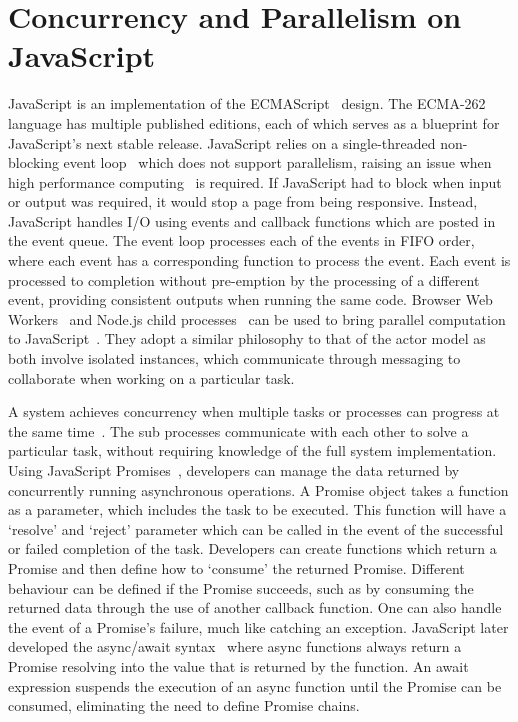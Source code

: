 \documentclass[oneside]{um-fict}
\begin{document}
\section{Concurrency and Parallelism on JavaScript}
JavaScript is an implementation of the ECMAScript~\cite{ecmascript} design. The ECMA-262 language has multiple published editions, each of which serves as a blueprint for JavaScript's next stable release. JavaScript relies on a single-threaded non-blocking event loop~\cite{eventloopbrowser, eventloopnode} which does not support parallelism, raising an issue when high performance computing~\cite{highperformance} is required. If JavaScript had to block when input or output was required, it would stop a page from being responsive. Instead, JavaScript handles I/O using events and callback functions which are posted in the event queue. The event loop processes each of the events in FIFO order, where each event has a corresponding function to process the event. Each event is processed to completion without pre-emption by the processing of a different event, providing consistent outputs when running the same code. Browser Web Workers~\cite{webworkers} and Node.js child processes~\cite{nodejs, cluster} can be used to bring parallel computation to JavaScript~\cite{concurrencyjs, spidersjs}. They adopt a similar philosophy to that of the actor model as both involve isolated instances, which communicate through messaging to collaborate when working on a particular task.

A system achieves concurrency when multiple tasks or processes can progress at the same time~\cite{concurrency}. The sub processes communicate with each other to solve a particular task, without requiring knowledge of the full system implementation. Using JavaScript Promises~\cite{promises}, developers can manage the data returned by concurrently running asynchronous operations. A Promise object takes a function as a parameter, which includes the task to be executed. This function will have a `resolve' and `reject' parameter which can be called in the event of the successful or failed completion of the task. Developers can create functions which return a Promise and then define how to `consume' the returned Promise. Different behaviour can be defined if the Promise succeeds, such as by consuming the returned data through the use of another callback function. One can also handle the event of a Promise's failure, much like catching an exception. JavaScript later developed the async/await syntax~\cite{async} where async functions always return a Promise resolving into the value that is returned by the function. An await expression suspends the execution of an async function until the Promise can be consumed, eliminating the need to define Promise chains.
\end{document}
